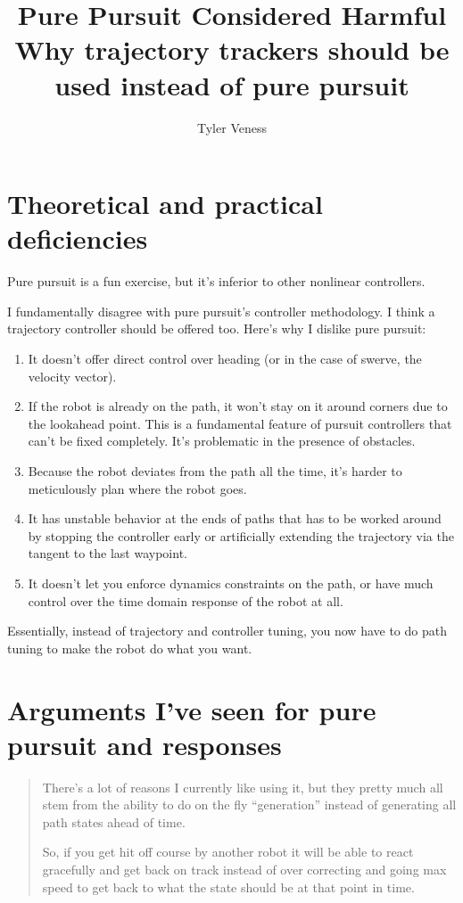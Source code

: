 \documentclass[10pt,conference,compsoc]{IEEEtran}
\begin{document}
\title{Pure Pursuit Considered Harmful \\ \large Why trajectory trackers should be used instead of pure pursuit}
\author{Tyler Veness}
\maketitle

\section{Theoretical and practical deficiencies}

Pure pursuit is a fun exercise, but it's inferior to other nonlinear
controllers.

I fundamentally disagree with pure pursuit's controller methodology. I think a
trajectory controller should be offered too. Here's why I dislike pure pursuit:
\begin{enumerate}
  \item It doesn't offer direct control over heading (or in the case of swerve,
    the velocity vector).
  \item If the robot is already on the path, it won't stay on it around corners
    due to the lookahead point. This is a fundamental feature of pursuit
    controllers that can't be fixed completely. It's problematic in the presence
    of obstacles.
  \item Because the robot deviates from the path all the time, it's harder to
    meticulously plan where the robot goes.
  \item It has unstable behavior at the ends of paths that has to be worked
    around by stopping the controller early or artificially extending the
    trajectory via the tangent to the last waypoint.
  \item It doesn't let you enforce dynamics constraints on the path, or have
    much control over the time domain response of the robot at all.
\end{enumerate}

Essentially, instead of trajectory and controller tuning, you now have to do
path tuning to make the robot do what you want.

\section{Arguments I've seen for pure pursuit and responses}
\begin{quote}
  There’s a lot of reasons I currently like using it, but they pretty much all
  stem from the ability to do on the fly “generation” instead of generating all
  path states ahead of time.

  So, if you get hit off course by another robot it will be able to react
  gracefully and get back on track instead of over correcting and going max
  speed to get back to what the state should be at that point in time.
\end{quote}
\end{document}
